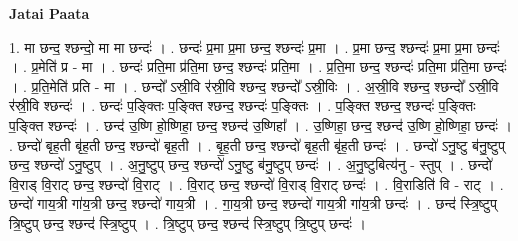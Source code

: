 \documentclass[17pt]{extarticle}
\begin{document}
\textbf{Jatai Paata} \newline

1. मा छन्द॒ श्छन्दो॒ मा मा छन्दः॑ । . छन्दः॑ प्र॒मा प्र॒मा छन्द॒ श्छन्दः॑ प्र॒मा । . प्र॒मा छन्द॒ श्छन्दः॑ प्र॒मा प्र॒मा छन्दः॑ । . प्र॒मेति॑ प्र - मा । . छन्दः॑ प्रति॒मा प्र॑ति॒मा छन्द॒ श्छन्दः॑ प्रति॒मा । . प्र॒ति॒मा छन्द॒ श्छन्दः॑ प्रति॒मा प्र॑ति॒मा छन्दः॑ । . प्र॒ति॒मेति॑ प्रति - मा । . छन्दो᳚ ऽस्री॒वि र॑स्री॒वि श्छन्द॒ श्छन्दो᳚ ऽस्री॒विः । . अ॒स्री॒वि श्छन्द॒ श्छन्दो᳚ ऽस्री॒वि र॑स्री॒वि श्छन्दः॑ । . छन्दः॑ प॒ङ्क्तिः प॒ङ्क्ति श्छन्द॒ श्छन्दः॑ प॒ङ्क्तिः । . प॒ङ्क्ति श्छन्द॒ श्छन्दः॑ प॒ङ्क्तिः प॒ङ्क्ति श्छन्दः॑ । . छन्द॑ उ॒ष्णि हो॒ष्णिहा॒ छन्द॒ श्छन्द॑ उ॒ष्णिहा᳚ । . उ॒ष्णिहा॒ छन्द॒ श्छन्द॑ उ॒ष्णि हो॒ष्णिहा॒ छन्दः॑ । . छन्दो॑ बृह॒ती बृ॑ह॒ती छन्द॒ श्छन्दो॑ बृह॒ती । . बृ॒ह॒ती छन्द॒ श्छन्दो॑ बृह॒ती बृ॑ह॒ती छन्दः॑ । . छन्दो॑ ऽनु॒ष्टु ब॑नु॒ष्टुप् छन्द॒ श्छन्दो॑ ऽनु॒ष्टुप् । . अ॒नु॒ष्टुप् छन्द॒ श्छन्दो॑ ऽनु॒ष्टु ब॑नु॒ष्टुप् छन्दः॑ । . अ॒नु॒ष्टुबित्य॑नु - स्तुप् । . छन्दो॑ वि॒राड् वि॒राट् छन्द॒ श्छन्दो॑ वि॒राट् । . वि॒राट् छन्द॒ श्छन्दो॑ वि॒राड् वि॒राट् छन्दः॑ । . वि॒राडिति॑ वि - राट् । . छन्दो॑ गाय॒त्री गा॑य॒त्री छन्द॒ श्छन्दो॑ गाय॒त्री । . गा॒य॒त्री छन्द॒ श्छन्दो॑ गाय॒त्री गा॑य॒त्री छन्दः॑ । . छन्द॑ स्त्रि॒ष्टुप् त्रि॒ष्टुप् छन्द॒ श्छन्द॑ स्त्रि॒ष्टुप् । . त्रि॒ष्टुप् छन्द॒ श्छन्द॑ स्त्रि॒ष्टुप् त्रि॒ष्टुप् छन्दः॑ । \newline
\end{document}
